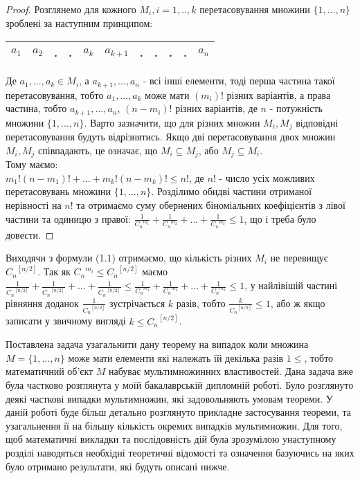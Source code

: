 \begin{proof}
Розглянемо для кожного $ M_i, i=1,..,k $ перетасовування множини $ \{1,...,n\} $ зроблені за наступним принципом:

\begin{center}
\begin{tabular}{ |c|c|c|c|c|c|c|c|c|c|c| } 
 \hline
 $a_1$ & $a_2$ & . & . & $a_k$ & $a_{k+1}$ & . & . & . & . & $a_n$ \\
 \hline
\end{tabular}
\end{center}

Де $ a_1,...,a_k \in M_i $, а $ a_{k+1},...,a_n $ - всі інші елементи, тоді перша частина такої перетасовування, тобто  $ a_1,...,a_k$ може мати $ (m_i)! $ різних варіантів, а права частина, тобто $ a_{k+1},...,a_n $, $ (n-m_i)!$ різних варіантів, де $n$ - потужність множини $ \{1,...,n\} $. Варто зазначити, що для різних множин $ M_i, M_j $ відповідні перетасовування будуть відрізнятись. Якщо дві перетасовування двох множин  $ M_i, M_j $ співпадають, це означає, що $ M_i \subseteq M_j $, або $ M_j \subseteq M_i $.
\\
Тому маємо:
\\
$m_1!(n-m_1)! + ... + m_k!(n-m_k)! \leq n! $, де $ n! $ - число усіх можливих перетасовувань множини $ \{1,...,n\} $. Розділимо обидві частини отриманої нерівності на $ n! $ та отримаємо суму обернених біноміальних коефіцієнтів з лівої частини та одиницю з правої: $\frac{1}{{C_n}^{m_1}} + \frac{1}{{C_n}^{m_2}} + ... + \frac{1}{{C_n}^{m_k}} \leq 1$, що і треба було довести.
\end{proof}

\begin{corollary}
Виходячи з формули (1.1) отримаємо, що кількість різних $ M_i $ не перевищує ${C_n}^{[n/2]}$. Так як ${C_n}^{m_i} \leq {C_n}^{[n/2]}$  маємо  $ \frac{1}{{C_n}^{[n/2]}} + \frac{1}{{C_n}^{[n/2]}} + ... + \frac{1}{{C_n}^{[n/2]}}   \leq \frac{1}{{C_n}^{m_1}} + \frac{1}{{C_n}^{m_2}} + ... + \frac{1}{{C_n}^{m_k}} \leq 1$, у найлівішій частині рівняння доданок $\frac{1}{{C_n}^{[n/2]}}$ зустрічається $k$ разів, тобто $\frac{k}{{C_n}^{[n/2]}} \leq 1$, або ж якщо записати у звичному вигляді $k \leq {C_n}^{[n/2]}$.
\end{corollary}

\par Поставлена задача узагальнити дану теорему на випадок коли множина $ M = \{1,...,n\} $ може мати елементи які належать їй декілька разів $ 1 \leq $, тобто математичний об'єкт $ M $ набуває мультимножинних властивостей. Дана задача вже була частково розглянута у моїй бакалаврській дипломній роботі. Було розглянуто деякі часткові випадки мультимножин, які задовольняють умовам теореми. У даній роботі буде більш детально розглянуто прикладне застосування теореми, та узагальнення її на більшу кількість окремих випадків мультимножин. Для того, щоб математичні викладки та послідовність дій була зрозумілою унаступному розділі наводяться необхідні теоретичні відомості та означення базуючись на яких було отримано результати, які будуть описані нижче.

